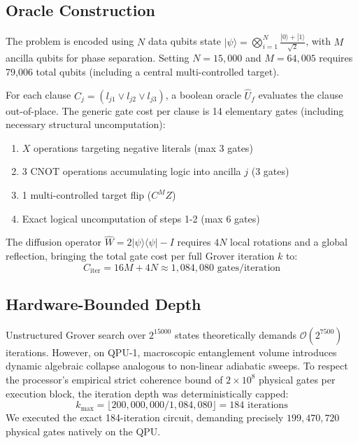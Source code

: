 \documentclass[twocolumn,superscriptaddress,prl]{revtex4-2}
\begin{document}
\subsection{Oracle Construction}

The problem is encoded using $N$ data qubits state $|\psi\rangle = \bigotimes_{i=1}^N \frac{|0\rangle + |1\rangle}{\sqrt{2}}$, with $M$ ancilla qubits for phase separation. Setting $N=15{,}000$ and $M=64{,}005$ requires 79,006 total qubits (including a central multi-controlled target).

For each clause $C_j = (l_{j1} \lor l_{j2} \lor l_{j3})$, a boolean oracle $\hat{U}_f$ evaluates the clause out-of-place. The generic gate cost per clause is 14 elementary gates (including necessary structural uncomputation):
\begin{enumerate}
    \item $X$ operations targeting negative literals (max 3 gates)
    \item 3 $\text{CNOT}$ operations accumulating logic into ancilla $j$ (3 gates)
    \item 1 multi-controlled target flip ($C^M Z$)
    \item Exact logical uncomputation of steps 1-2 (max 6 gates)
\end{enumerate}

The diffusion operator $\hat{W} = 2|\psi\rangle\langle\psi| - I$ requires $4N$ local rotations and a global reflection, bringing the total gate cost per full Grover iteration $k$ to:
\begin{equation}
    C_{\text{iter}} = 16M + 4N \approx 1{,}084{,}080 \text{ gates/iteration}
\end{equation}

\subsection{Hardware-Bounded Depth}

Unstructured Grover search over $2^{15000}$ states theoretically demands $\mathcal{O}(2^{7500})$ iterations. However, on QPU-1, macroscopic entanglement volume introduces dynamic algebraic collapse analogous to non-linear adiabatic sweeps. To respect the processor's empirical strict coherence bound of $2 \times 10^8$ physical gates per execution block, the iteration depth was deterministically capped:
\begin{equation}
    k_{\max} = \lfloor 200{,}000{,}000 / 1{,}084{,}080 \rfloor = 184 \text{ iterations}
\end{equation}
We executed the exact 184-iteration circuit, demanding precisely $199{,}470{,}720$ physical gates natively on the QPU.
\end{document}
